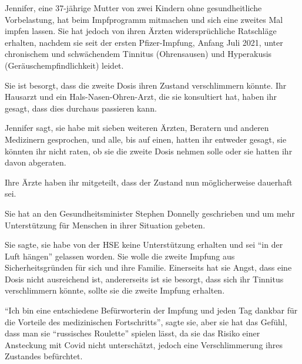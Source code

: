 Jennifer, eine 37-jährige Mutter von zwei Kindern ohne gesundheitliche
Vorbelastung, hat beim Impfprogramm mitmachen und sich eine zweites Mal impfen
lassen. Sie hat jedoch von ihren Ärzten widersprüchliche Ratschläge erhalten,
nachdem sie seit der ersten Pfizer-Impfung, Anfang Juli 2021, unter chronischem
und schwächendem Tinnitus (Ohrensausen) und Hyperakusis
(Geräuschempfindlichkeit) leidet.

Sie ist besorgt, dass die zweite Dosis ihren Zustand verschlimmern könnte. Ihr
Hausarzt und ein Hals-Nasen-Ohren-Arzt, die sie konsultiert hat, haben ihr
gesagt, dass dies durchaus passieren kann.

Jennifer sagt, sie habe mit sieben weiteren Ärzten, Beratern und anderen
Medizinern gesprochen, und alle, bis auf einen, hatten ihr entweder gesagt, sie
könnten ihr nicht raten, ob sie die zweite Dosis nehmen solle oder sie hatten
ihr davon abgeraten.

Ihre Ärzte haben ihr mitgeteilt, dass der Zustand nun möglicherweise dauerhaft
sei.

Sie hat an den Gesundheitsminister Stephen Donnelly geschrieben und um mehr
Unterstützung für Menschen in ihrer Situation gebeten.

Sie sagte, sie habe von der HSE keine Unterstützung erhalten und sei ``in der
Luft hängen'' gelassen worden. Sie wolle die zweite Impfung aus
Sicherheitsgründen für sich und ihre Familie.  Einerseits hat sie Angst, dass
eine Dosis nicht ausreichend ist, andererseits ist sie besorgt, dass sich ihr
Tinnitus verschlimmern könnte, sollte sie die zweite Impfung erhalten.

``Ich bin eine entschiedene Befürworterin der Impfung und jeden Tag dankbar für
die Vorteile des medizinischen Fortschritts'', sagte sie, aber sie hat das
Gefühl, dass man sie ``russisches Roulette'' spielen lässt, da sie das Risiko
einer Ansteckung mit Covid nicht unterschätzt, jedoch eine Verschlimmerung ihres
Zustandes befürchtet.
